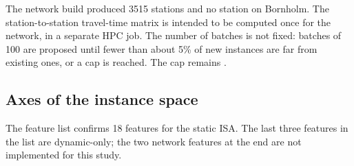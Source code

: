 The network build produced 3515 stations and no station on Bornholm. The
station-to-station travel-time matrix is intended to be computed once for the
network, in a separate HPC job. The number of batches is not fixed: batches of
100 are proposed until fewer than about 5\% of new instances are far from
existing ones, or a cap is reached. The cap remains \tagopen[S4].

\subsection{Axes of the instance space}

The feature list confirms 18 features for the static ISA. The last three
features in the list are dynamic-only; the two network features at the end are
not implemented for this study.

